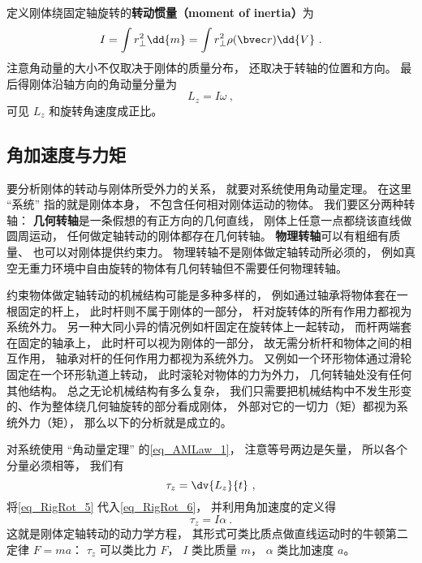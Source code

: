 定义刚体绕固定轴旋转的\textbf{转动惯量（moment of inertia）}为
\begin{equation}
I = \int r_ \bot ^2 \dd{m} = \int r_ \bot ^2\rho(\bvec r) \dd{V} ~.
\end{equation}
注意角动量的大小不仅取决于刚体的质量分布， 还取决于转轴的位置和方向。 最后得刚体沿轴方向的角动量分量为
\begin{equation}\label{eq_RigRot_5}
L_z = I \omega ~,
\end{equation}
可见 $L_z$ 和旋转角速度成正比。

\subsection{角加速度与力矩}
要分析刚体的转动与刚体所受外力的关系， 就要对系统使用角动量定理。 在这里 “系统” 指的就是刚体本身， 不包含任何相对刚体运动的物体。 我们要区分两种转轴： \textbf{几何转轴}是一条假想的有正方向的几何直线， 刚体上任意一点都绕该直线做圆周运动， 任何做定轴转动的刚体都存在几何转轴。 \textbf{物理转轴}可以有粗细有质量、 也可以对刚体提供约束力。 物理转轴不是刚体做定轴转动所必须的， 例如真空无重力环境中自由旋转的物体有几何转轴但不需要任何物理转轴。

约束物体做定轴转动的机械结构可能是多种多样的， 例如通过轴承将物体套在一根固定的杆上， 此时杆则不属于刚体的一部分， 杆对旋转体的所有作用力都视为系统外力。 另一种大同小异的情况例如杆固定在旋转体上一起转动， 而杆两端套在固定的轴承上， 此时杆可以视为刚体的一部分， 故无需分析杆和物体之间的相互作用， 轴承对杆的任何作用力都视为系统外力。 又例如一个环形物体通过滑轮固定在一个环形轨道上转动， 此时滚轮对物体的力为外力， 几何转轴处没有任何其他结构。 总之无论机械结构有多么复杂， 我们只需要把机械结构中不发生形变的、作为整体绕几何轴旋转的部分看成刚体， 外部对它的一切力（矩）都视为系统外力（矩）， 那么以下的分析就是成立的。

对系统使用 “角动量定理” 的\autoref{eq_AMLaw_1}， 注意等号两边是矢量， 所以各个分量必须相等， 我们有
\begin{equation}\label{eq_RigRot_6}
\tau_z = \dv{L_z}{t}~,
\end{equation}
将\autoref{eq_RigRot_5} 代入\autoref{eq_RigRot_6}， 并利用角加速度的定义得
\begin{equation}\label{eq_RigRot_7}
\tau_z = I\alpha~.
\end{equation}
这就是刚体定轴转动的动力学方程， 其形式可类比质点做直线运动时的牛顿第二定律 $F = ma$： $\tau_z$ 可以类比力 $F$， $I$ 类比质量 $m$， $\alpha$ 类比加速度 $a$。

